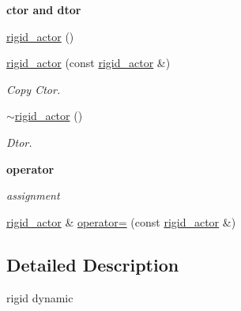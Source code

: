 \begin{Indent}{\bf ctor and dtor}\par
{\em \label{_amgrp98fbd3e5ae66fcd014fb744fec76c58d}
 }\begin{DoxyCompactItemize}
\item 
\hyperlink{classnebula_1_1content_1_1actor_1_1physics_1_1physx_1_1rigid__actor_ab178feb95b5515d4aacf05ec19e89918}{rigid\_\-actor} ()
\item 
\hyperlink{classnebula_1_1content_1_1actor_1_1physics_1_1physx_1_1rigid__actor_aa2f8aa3c353d8c2ed22e02884cc1df2a}{rigid\_\-actor} (const \hyperlink{classnebula_1_1content_1_1actor_1_1physics_1_1physx_1_1rigid__actor}{rigid\_\-actor} \&)
\begin{DoxyCompactList}\small\item\em Copy Ctor. \item\end{DoxyCompactList}\item 
\hyperlink{classnebula_1_1content_1_1actor_1_1physics_1_1physx_1_1rigid__actor_a29f3ac242b4c5b45ce8c40233ba89990}{$\sim$rigid\_\-actor} ()
\begin{DoxyCompactList}\small\item\em Dtor. \item\end{DoxyCompactList}\end{DoxyCompactItemize}
\end{Indent}
\begin{Indent}{\bf operator}\par
{\em \label{_amgrp4b583376b2767b923c3e1da60d10de59}
 assignment }\begin{DoxyCompactItemize}
\item 
\hyperlink{classnebula_1_1content_1_1actor_1_1physics_1_1physx_1_1rigid__actor}{rigid\_\-actor} \& \hyperlink{classnebula_1_1content_1_1actor_1_1physics_1_1physx_1_1rigid__actor_a154a4725bb0aeaace59931e56be6258a}{operator=} (const \hyperlink{classnebula_1_1content_1_1actor_1_1physics_1_1physx_1_1rigid__actor}{rigid\_\-actor} \&)
\end{DoxyCompactItemize}
\end{Indent}


\subsection{Detailed Description}
rigid dynamic 

